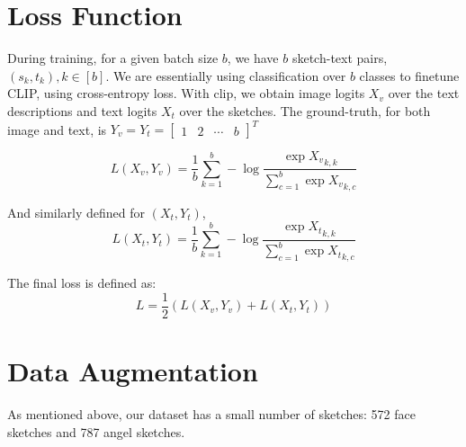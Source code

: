 \section{Loss Function}
During training, for a given batch size $b$, we have $b$ sketch-text pairs, $(s_k,t_k), k\in [b]$. We are essentially using classification over $b$ classes to finetune CLIP, using cross-entropy loss. With clip, we obtain image logits $X_v$ over the text descriptions and text logits $X_t$ over the sketches. The ground-truth, for both image and text, is 
$Y_v = Y_t = \begin{bmatrix}1 & 2 & \cdots & b \end{bmatrix}^T $ 

$$L(X_v, Y_v) = \dfrac{1}{b} \sum_{k=1}^b -\log\frac{\exp{{X_v}_{k,k}}}{ \sum_{c=1}^b \exp{{X_v}_{k,c}} } $$

And similarly defined for $(X_t, Y_t)$,
$$L(X_t, Y_t) = \dfrac{1}{b} \sum_{k=1}^b -\log\frac{\exp{{X_t}_{k,k}}}{ \sum_{c=1}^b \exp{{X_t}_{k,c}} } $$

The final loss is defined as:
$$L = \dfrac{1}{2} (L(X_v, Y_v) + L(X_t, Y_t))$$

\section{Data Augmentation}
As mentioned above, our dataset has a small number of sketches: 572 face sketches and 787 angel sketches.  